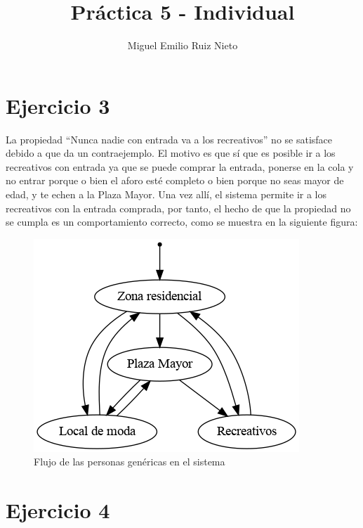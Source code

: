 \documentclass[a4paper,11pt]{report}
\begin{document}
	\title{Práctica 5 - Individual}
	\author{
		Miguel Emilio Ruiz Nieto
	}

	\maketitle

  \section*{Ejercicio 3}

  La propiedad ``Nunca nadie con entrada va a los recreativos'' no se satisface
  debido a que da un contraejemplo. El motivo es que sí que es posible ir a los
  recreativos con entrada ya que se puede comprar la entrada, ponerse en la
  cola y no entrar porque o bien el aforo esté completo o bien porque no seas
  mayor de edad, y te echen a la Plaza Mayor. Una vez allí, el sistema permite
  ir a los recreativos con la entrada comprada, por tanto, el hecho de que la
  propiedad no se cumpla es un comportamiento correcto, como se muestra en la
  siguiente figura:
  \begin{figure}[h]
    \includegraphics[scale=0.5]{lugares.png}
    \centering
    \caption{Flujo de las personas genéricas en el sistema}
  \end{figure}

  \section*{Ejercicio 4}

\end{document}
